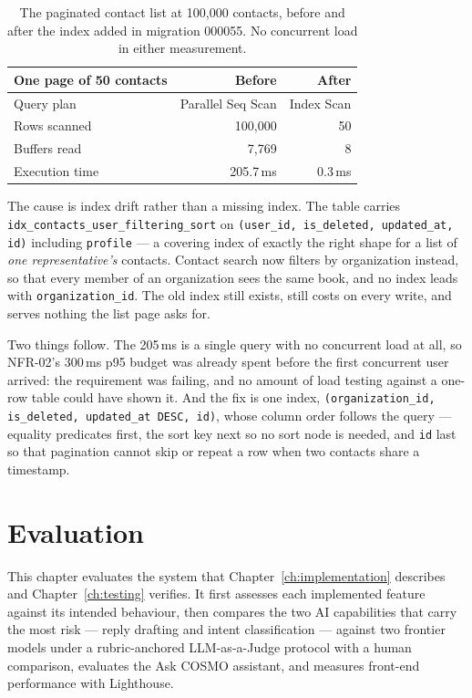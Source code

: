 \documentclass[a4paper]{article}
\begin{document}
\begin{table}[H]
\centering
\caption{The paginated contact list at 100{,}000 contacts, before and after the
index added in migration 000055. No concurrent load in either measurement.}
\label{tab:volume-test}
\small
\begin{tabular}{|p{4.6cm}|r|r|}
\hline
\textbf{One page of 50 contacts} & \textbf{Before} & \textbf{After} \\
\hline
Query plan & Parallel Seq Scan & Index Scan \\
\hline
Rows scanned & 100{,}000 & 50 \\
\hline
Buffers read & 7{,}769 & 8 \\
\hline
Execution time & 205.7\,ms & 0.3\,ms \\
\hline
\end{tabular}
\end{table}

The cause is index drift rather than a missing index. The table carries
\texttt{idx\_contacts\_user\_filtering\_sort} on
\texttt{(user\_id, is\_deleted, updated\_at, id)} including \texttt{profile} ---
a covering index of exactly the right shape for a list of \emph{one
representative's} contacts. Contact search now filters by organization instead,
so that every member of an organization sees the same book, and no index leads
with \texttt{organization\_id}. The old index still exists, still costs on every
write, and serves nothing the list page asks for.

Two things follow. The 205\,ms is a single query with no concurrent load at
all, so NFR-02's 300\,ms p95 budget was already spent before the first
concurrent user arrived: the requirement was failing, and no amount of load
testing against a one-row table could have shown it. And the fix is one index,
\texttt{(organization\_id, is\_deleted, updated\_at DESC, id)}, whose column
order follows the query --- equality predicates first, the sort key next so no
sort node is needed, and \texttt{id} last so that pagination cannot skip or
repeat a row when two contacts share a timestamp.


\newpage
\section{Evaluation}
\label{ch:evaluation}

This chapter evaluates the system that Chapter~\ref{ch:implementation} describes
and Chapter~\ref{ch:testing} verifies. It first assesses each implemented feature
against its intended behaviour, then compares the two AI capabilities that carry
the most risk --- reply drafting and intent classification --- against two
frontier models under a rubric-anchored LLM-as-a-Judge protocol with a human
comparison, evaluates the Ask COSMO assistant, and measures front-end
performance with Lighthouse.
\end{document}
